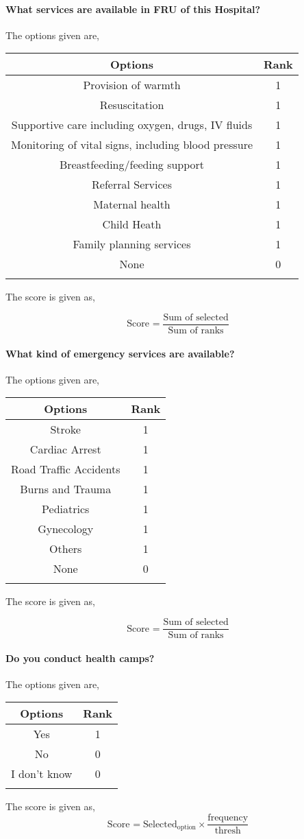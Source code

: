 \documentclass[oneside]{article}
\newcommand{\tsub}[2]{\text{#1}_{\text{#2}}}
\newcommand{\dsub}[2]{\dfrac{\text{#1}}{\text{#2}}}
\newcommand{\multsel}[1]
{
	\[
		\tsub{Score}{#1} = \dsub{Sum of selected}{Sum of ranks}
	\]
}
\newenvironment{ttable}
{
\begin{center}
\begin{tabular}{c|c}
\hline
}
{
\\ \hline
\end{tabular}
\end{center}
}
\begin{document}
\paragraph{ What services are available in FRU of this Hospital?}

The options given are,
\begin{ttable}
Options & Rank \\ \hline
Provision of warmth & 1 \\
Resuscitation & 1 \\
Supportive care including oxygen, drugs, IV fluids & 1 \\
Monitoring of vital signs, including blood pressure & 1 \\
Breastfeeding/feeding support & 1 \\
Referral Services & 1 \\
Maternal health & 1 \\
Child Heath & 1 \\
Family planning services & 1 \\
None & 0 \\
\hline
\end{ttable}
The score is given as,
\multsel{}
\paragraph{ What kind of emergency services are available?}

The options given are,
\begin{ttable}
Options & Rank \\ \hline
Stroke & 1 \\
Cardiac Arrest & 1 \\
Road Traffic Accidents & 1 \\
Burns and Trauma & 1 \\
Pediatrics & 1 \\
Gynecology & 1 \\
Others & 1 \\
None & 0 \\
\hline
\end{ttable}
The score is given as,
\multsel{}
\paragraph{ Do you conduct health camps?}

The options given are,
\begin{ttable}
Options & Rank \\ \hline
Yes & 1 \\
No & 0 \\
I don't know & 0 \\
\hline
\end{ttable}
The score is given as,
\[
	\tsub{Score}{} = \tsub{Selected}{option} \times \dsub{frequency}{thresh}
\]
\end{document}
